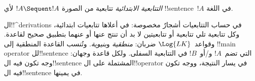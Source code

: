 \documentclass[../../../include/open-logic-section]{subfiles}
\begin{document}
\begin{defn}
\emph{التتابعية الابتدائية} تتابعية
{من الصورة $!A \Sequent !A$} لأي !!{sentence}~$!A$ في اللغة.
\end{defn}

ال!!^{derivation}s في حساب التتابعيات أشجارٌ مخصوصة: في أعلاها تتابعيات ابتدائية، وكل تتابعية تلي تتابعية أو تتابعيتين لا بد أن تنتج عنها أو عنهما بتطبيق صحيح لقاعدة.
وقواعد~$\Log{LK}$ ضربان: \emph{منطقية} و\emph{بنيوية}.
وتُنسب القاعدة المنطقية إلى !!{main operator} لل!!{sentence} التي تضم~$!A$ و/أو~$!B$ في التتابعية السفلى.
ولكل قاعدة وجهان: وجه تكون فيه ال!!{sentence} المشتملة على ال!!{operator} في يسار النتيجة، ووجه تكون فيه ال!!{sentence} في يمينها.
\end{document}
